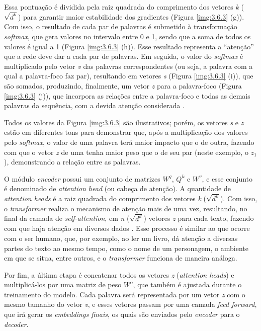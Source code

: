 Essa pontuação é dividida pela raiz quadrada do comprimento dos vetores \textit{k} ($\sqrt{d^k}$) para garantir maior estabilidade dos gradientes (Figura \ref{img:3.6.3} (g)). Com isso, o resultado de cada par de palavras é submetido à transformação \textit{softmax}, que gera valores no intervalo entre 0 e 1, sendo que a soma de todos os valores é igual a 1 (Figura \ref{img:3.6.3} (h)). Esse resultado representa a “atenção” que a rede deve dar a cada par de palavras. Em seguida, o valor do \textit{softmax} é multiplicado pelo vetor \textit{v} das palavras correspondentes (ou seja, a palavra com a qual a palavra-foco faz par), resultando em vetores \textit{s} (Figura \ref{img:3.6.3} (i)), que são somados, produzindo, finalmente, um vetor \textit{z} para a palavra-foco (Figura \ref{img:3.6.3} (j)), que incorpora as relações entre a palavra-foco e todas as demais palavras da sequência, com a devida atenção considerada \cite{vaswani2017}.

Todos os valores da Figura \ref{img:3.6.3} são ilustrativos; porém, os vetores \textit{s} e \textit{z} estão em diferentes tons para demonstrar que, após a multiplicação dos valores pelo \textit{softmax}, o valor de uma palavra terá maior impacto que o de outra, fazendo com que o vetor \textit{z} de uma tenha maior peso que o de seu par (neste exemplo, o $z_{1}$), demonstrando a relação entre as palavras.

O módulo \textit{encoder} possui um conjunto de matrizes $W^q$, $Q^k$ e $W^v$, e esse conjunto é denominado de \textit{attention head} (ou cabeça de atenção). A quantidade de \textit{attention heads} é a raiz quadrada do comprimento dos vetores \textit{k} ($\sqrt{d^k}$). Com isso, o \textit{transformer} realiza o mecanismo de atenção mais de uma vez, resultando, no final da camada de \textit{self-attention}, em \textit{n} ($\sqrt{d^k}$) vetores \textit{z} para cada texto, fazendo com que haja atenção em diversos dados \cite{popel2018}. Esse processo é similar ao que ocorre com o ser humano, que, por exemplo, ao ler um livro, dá atenção a diversas partes do texto ao mesmo tempo, como o nome de um personagem, o ambiente em que se situa, entre outros, e o \textit{transformer} funciona de maneira análoga.

Por fim, a última etapa é concatenar todos os vetores \textit{z} (\textit{attention heads}) e multiplicá-los por uma matriz de peso $W^o$, que também é ajustada durante o treinamento do modelo. Cada palavra será representada por um vetor \textit{z} com o mesmo tamanho do vetor \textit{v}, e esses vetores passam por uma camada \textit{feed forward}, que irá gerar os \textit{embeddings finais}, os quais são enviados pelo \textit{encoder} para o \textit{decoder}.

